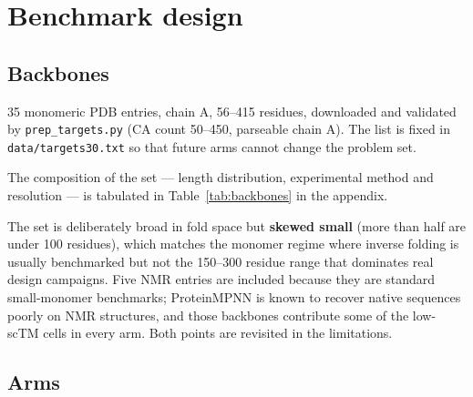 \section{Benchmark design}
\label{sec:method}

\subsection{Backbones}
\label{sec:backbones}

35 monomeric PDB entries, chain A, 56--415 residues, downloaded and validated
by \texttt{prep\_targets.py} (CA count 50--450, parseable chain A). The list is
fixed in \texttt{data/targets30.txt} so that future arms cannot change the
problem set.

The composition of the set --- length distribution, experimental method and
resolution --- is tabulated in Table~\ref{tab:backbones} in the appendix.

The set is deliberately broad in fold space but \textbf{skewed small} (more
than half are under 100 residues), which matches the monomer regime where
inverse folding is usually benchmarked but not the 150--300 residue range that
dominates real design campaigns. Five NMR entries are included because they are
standard small-monomer benchmarks; ProteinMPNN is known to recover native
sequences poorly on NMR structures, and those backbones contribute some of the
low-scTM cells in every arm. Both points are revisited in the limitations.

\subsection{Arms}
\label{sec:arms}

